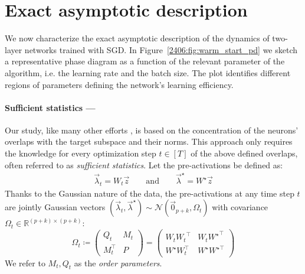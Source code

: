 \section{Exact asymptotic description}
\label{2406:sec:main:warm_start}
We now characterize the exact asymptotic description of the dynamics of two-layer networks trained with SGD. In Figure~\ref{2406:fig:warm_start_pd} we sketch a representative phase diagram as a function of the relevant parameter of the algorithm, i.e. the learning rate and the batch size. The plot identifies different regions of parameters defining the network's learning efficiency.

\paragraph{Sufficient statistics ---}
Our study, like many other efforts \citep{arous2022high,saad1995line}, is based on the concentration of the neurons' overlaps with the target subspace and their norms. This approach only requires the knowledge for every optimization step $t \in [T]$ of the above defined overlaps, often referred to as \textit{sufficient statistics}. Let the pre-activations be defined as:
\begin{align}
    \vec \lambda_t = W_t \vec z \qquad  \text{and} \qquad \vec \lambda^\star = W^\star \vec z
\end{align}
Thanks to the Gaussian nature of the data, the pre-activations at any time step $t$ are jointly Gaussian vectors $(\vec{\lambda}_t, {\vec{\lambda}^{\star}})\sim\mathcal{N}(\vec{0}_{p+k}, \Omega_t)$ with covariance
$\Omega_t \in\mathbb{R}^{(p+k)\times (p+k)}
$: 
\begin{equation}
\label{2406:eq:main:covariance_def}
\Omega_t \coloneqq
\begin{pmatrix}
Q_t & M_t\\
{M_{t}^\top} & P
\end{pmatrix}=
\begin{pmatrix}
W_t{W_t}^{\top} & W_t{W^{\star}}^{\top}\\
W^{\star}W_{t}^\top & W^{\star} W^{\star \top}
\end{pmatrix}
\end{equation}
We refer to $M_t,Q_t$ as the \textit{order parameters}.

